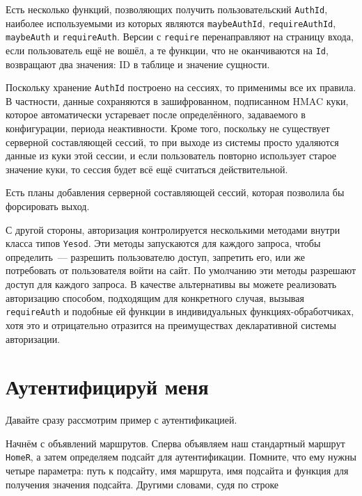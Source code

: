 Есть несколько функций, позволяющих получить пользовательский
\lstinline'AuthId', наиболее используемыми из которых являются
\lstinline'maybeAuthId', \lstinline'requireAuthId', \lstinline'maybeAuth' и
\lstinline'requireAuth'. Версии с \lstinline'require' перенаправляют на
страницу входа, если пользователь ещё не вошёл, а те функции, что не
оканчиваются на \lstinline'Id', возвращают два значения: ID в таблице и
значение сущности.

Поскольку хранение \lstinline'AuthId' построено на сессиях, то применимы все их
правила. В частности, данные сохраняются в зашифрованном, подписанном HMAC
куки, которое автоматически устаревает после определённого, задаваемого в
конфигурации, периода неактивности. Кроме того, поскольку не существует
серверной составляющей сессий, то при выходе из системы просто удаляются данные
из куки этой сессии, и если пользователь повторно использует старое значение
куки, то сессия будет всё ещё считаться действительной.

\begin{remark}
    Есть планы добавления серверной составляющей сессий, которая позволила бы
    форсировать выход.
\end{remark}

С другой стороны, авторизация контролируется несколькими методами внутри класса
типов \lstinline'Yesod'. Эти методы запускаются для каждого запроса, чтобы
определить~--- разрешить пользователю доступ, запретить его, или же потребовать
от пользователя войти на сайт. По умолчанию эти методы разрешают доступ для
каждого запроса. В качестве альтернативы вы можете реализовать авторизацию
способом, подходящим для конкретного случая, вызывая \lstinline'requireAuth' и
подобные ей функции в индивидуальных функциях-обработчиках, хотя это и
отрицательно отразится на преимуществах декларативной системы авторизации.

\section{Аутентифицируй меня}

Давайте сразу рассмотрим пример с аутентификацией.


Начнём с объявлений маршрутов. Сперва объявляем наш стандартный маршрут
\lstinline'HomeR', а затем определяем подсайт для аутентификации. Помните, что
ему нужны четыре параметра: путь к подсайту, имя маршрута, имя подсайта и
функция для получения значения подсайта. Другими словами, судя по строке

